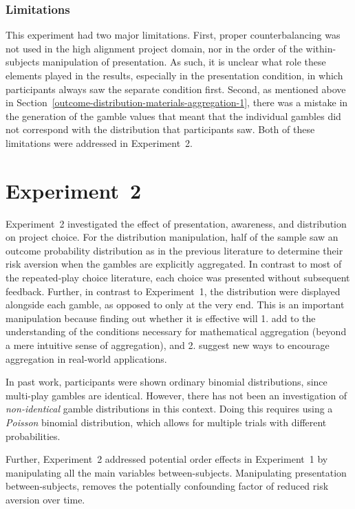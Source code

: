 \documentclass[a4paper, nobind, dvipsnames]{templates/ociamthesis}
\theoremstyle{definition}
\theoremstyle{definition}
\theoremstyle{definition}
\theoremstyle{definition}
\theoremstyle{remark}
\begin{document}
\subsubsection{Limitations}

This experiment had two major limitations. First, proper counterbalancing was
not used in the high alignment project domain, nor in the order of the
within-subjects manipulation of presentation. As such, it is unclear what role
these elements played in the results, especially in the presentation condition,
in which participants always saw the separate condition first. Second, as
mentioned above in Section~\ref{outcome-distribution-materials-aggregation-1},
there was a mistake in the generation of the gamble values that meant that the
individual gambles did not correspond with the distribution that participants
saw. Both of these limitations were addressed in Experiment~2.

\hypertarget{aggregation-2}{%
\section{Experiment~2}\label{aggregation-2}}

Experiment~2 investigated the effect of presentation, awareness, and
distribution on project choice. For the distribution manipulation, half of the
sample saw an outcome probability distribution as in the previous literature
\autocites[e.g.,][]{redelmeier1992,webb2017} to determine their risk aversion when the
gambles are explicitly aggregated. In contrast to most of the repeated-play
choice literature, each choice was presented without subsequent feedback.
Further, in contrast to Experiment~1, the distribution were displayed alongside
each gamble, as opposed to only at the very end. This is an important
manipulation because finding out whether it is effective will 1. add to the
understanding of the conditions necessary for mathematical aggregation (beyond a
mere intuitive sense of aggregation), and 2. suggest new ways to encourage
aggregation in real-world applications.

In past work, participants were shown ordinary binomial distributions, since
multi-play gambles are identical. However, there has not been an investigation
of \emph{non-identical} gamble distributions in this context. Doing this requires
using a \emph{Poisson} binomial distribution, which allows for multiple trials with
different probabilities.

Further, Experiment~2 addressed potential order effects in Experiment~1 by
manipulating all the main variables between-subjects. Manipulating presentation
between-subjects, removes the potentially confounding factor of reduced risk
aversion over time.
\end{document}
